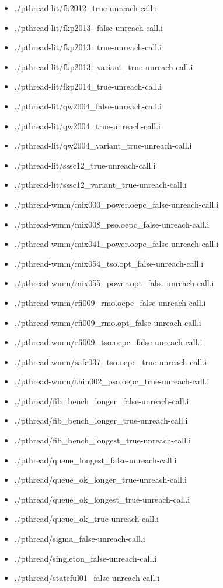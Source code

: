 \documentclass[envcountsame]{llncs}
\begin{document}
\begin{itemize}
\item ./pthread-lit/fk2012\_true-unreach-call.i
\item ./pthread-lit/fkp2013\_false-unreach-call.i
\item ./pthread-lit/fkp2013\_true-unreach-call.i
\item ./pthread-lit/fkp2013\_variant\_true-unreach-call.i
\item ./pthread-lit/fkp2014\_true-unreach-call.i
\item ./pthread-lit/qw2004\_false-unreach-call.i
\item ./pthread-lit/qw2004\_true-unreach-call.i
\item ./pthread-lit/qw2004\_variant\_true-unreach-call.i
\item ./pthread-lit/sssc12\_true-unreach-call.i
\item ./pthread-lit/sssc12\_variant\_true-unreach-call.i


\item ./pthread-wmm/mix000\_power.oepc\_false-unreach-call.i
\item ./pthread-wmm/mix008\_pso.oepc\_false-unreach-call.i
\item ./pthread-wmm/mix041\_power.oepc\_false-unreach-call.i
\item ./pthread-wmm/mix054\_tso.opt\_false-unreach-call.i
\item ./pthread-wmm/mix055\_power.opt\_false-unreach-call.i
\item ./pthread-wmm/rfi009\_rmo.oepc\_false-unreach-call.i
\item ./pthread-wmm/rfi009\_rmo.opt\_false-unreach-call.i
\item ./pthread-wmm/rfi009\_tso.oepc\_false-unreach-call.i
\item ./pthread-wmm/safe037\_tso.oepc\_true-unreach-call.i
\item ./pthread-wmm/thin002\_pso.oepc\_true-unreach-call.i


\item ./pthread/fib\_bench\_longer\_false-unreach-call.i
\item ./pthread/fib\_bench\_longer\_true-unreach-call.i
\item ./pthread/fib\_bench\_longest\_true-unreach-call.i
\item ./pthread/queue\_longest\_false-unreach-call.i
\item ./pthread/queue\_ok\_longer\_true-unreach-call.i
\item ./pthread/queue\_ok\_longest\_true-unreach-call.i
\item ./pthread/queue\_ok\_true-unreach-call.i
\item ./pthread/sigma\_false-unreach-call.i
\item ./pthread/singleton\_false-unreach-call.i
\item ./pthread/stateful01\_false-unreach-call.i



\end{itemize}
\end{document}

